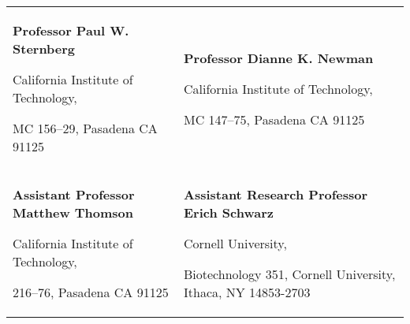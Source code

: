
\begin{tabularx}{\textwidth}{@{}X X@{}}
\textbf{Professor Paul W. Sternberg}\par
  California Institute of Technology,\par
  MC 156--29, Pasadena CA 91125\par
  \makefield{\faEnvelopeO}{\url{pws@caltech.edu}}
&
\textbf{Professor Dianne K. Newman}\par
  California Institute of Technology,\par
  MC 147--75, Pasadena CA 91125\par
  \makefield{\faEnvelopeO}{\url{dkn@caltech.edu}}\\

\vspace{3mm}

\textbf{Assistant Professor Matthew Thomson}\par
  California Institute of Technology,\par
  216--76, Pasadena CA 91125\par
  \makefield{\faEnvelopeO}{\url{mthomson@caltech.edu}}
&
\vspace{3mm}
\textbf{Assistant Research Professor Erich Schwarz}\par
  Cornell University,\par
  Biotechnology 351, Cornell University, Ithaca, NY 14853-2703\par
  \makefield{\faEnvelopeO}{\url{ems394@cornell.edu}}
\end{tabularx}
%
%
